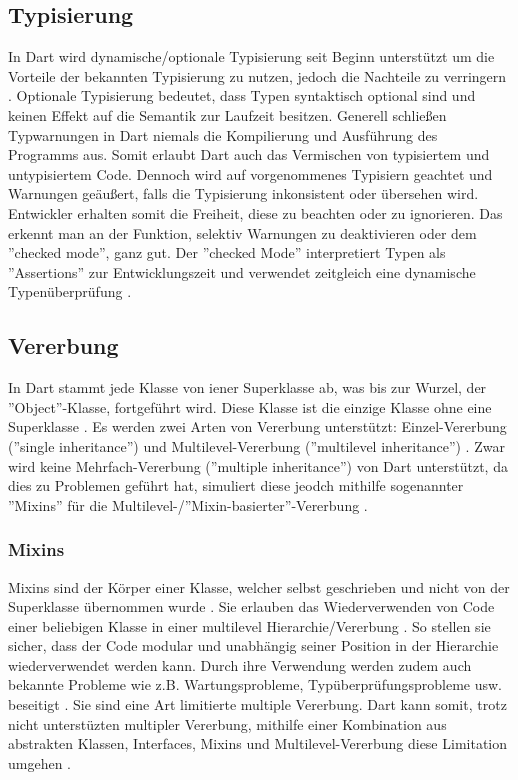 \subsection{Typisierung}
\label{subsec:Dart:Typisierung}
In Dart wird dynamische/optionale Typisierung seit Beginn unterstützt um die Vorteile der bekannten Typisierung zu nutzen, jedoch die Nachteile zu verringern \cite{book:Dart:StartGuideDart_SanjibSinha, book:Dart:DPL_GiladBracha}.
Optionale Typisierung bedeutet, dass Typen syntaktisch optional sind und keinen Effekt auf die Semantik zur Laufzeit besitzen.
Generell schließen Typwarnungen in Dart niemals die Kompilierung und Ausführung des Programms aus.
Somit erlaubt Dart auch das Vermischen von typisiertem und untypisiertem Code. 
Dennoch wird auf vorgenommenes Typisiern geachtet und Warnungen geäußert, falls die Typisierung inkonsistent oder übersehen wird.
Entwickler erhalten somit die Freiheit, diese zu beachten oder zu ignorieren.
Das erkennt man an der Funktion, selektiv Warnungen zu deaktivieren oder dem ''checked mode'', ganz gut.
Der ''checked Mode'' interpretiert Typen als ''Assertions'' zur Entwicklungszeit und verwendet zeitgleich eine dynamische Typenüberprüfung \cite{book:Dart:DPL_GiladBracha}.

\subsection{Vererbung}
\label{subsec:Dart:Vererbung}
In Dart stammt jede Klasse von iener Superklasse ab, was bis zur Wurzel, der ''Object''-Klasse, fortgeführt wird. Diese Klasse ist die einzige Klasse ohne eine Superklasse \cite{book:Dart:DPL_GiladBracha}.
Es werden zwei Arten von Vererbung unterstützt: Einzel-Vererbung (''single inheritance'') und Multilevel-Vererbung (''multilevel inheritance'') \cite{book:Dart:StartGuideDart_SanjibSinha}.
Zwar wird keine Mehrfach-Vererbung (''multiple inheritance'') von Dart unterstützt, da dies zu Problemen geführt hat, simuliert diese jeodch mithilfe sogenannter ''Mixins'' für die Multilevel-/''Mixin-basierter''-Vererbung \cite{book:Dart:DPL_GiladBracha}.

    \subsubsection{Mixins}
    \label{subsubsec:Dart:Vererbung:Mixins}
    Mixins sind der Körper einer Klasse, welcher selbst geschrieben und nicht von der Superklasse übernommen wurde \cite{book:Dart:DPL_GiladBracha}.
    Sie erlauben das Wiederverwenden von Code einer beliebigen Klasse in einer multilevel Hierarchie/Vererbung \cite{book:Dart:StartGuideDart_SanjibSinha}.
    So stellen sie sicher, dass der Code modular und unabhängig seiner Position in der Hierarchie wiederverwendet werden kann.
    Durch ihre Verwendung werden zudem auch bekannte Probleme wie z.B. Wartungsprobleme, Typüberprüfungsprobleme usw. beseitigt \cite{book:Dart:DPL_GiladBracha}.
    Sie sind eine Art limitierte multiple Vererbung. 
    Dart kann somit, trotz nicht unterstüzten multipler Vererbung, mithilfe einer Kombination aus abstrakten Klassen, Interfaces, Mixins und Multilevel-Vererbung diese Limitation umgehen \cite{book:Dart:StartGuideDart_SanjibSinha}.

